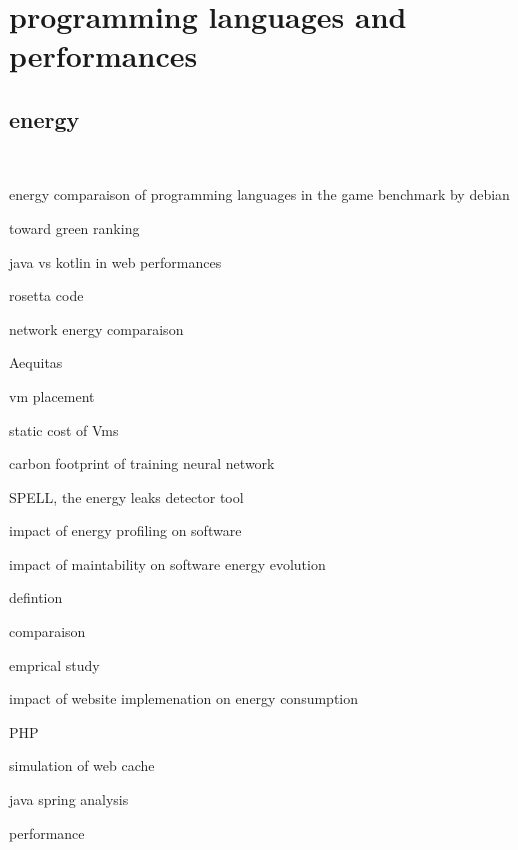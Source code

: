 \cite{marathe2017empirical}



\section{programming languages and performances}\label{section:soa_optimization}
\subsection{energy}\


energy comparaison of programming languages in the game benchmark by debian \cite{pereira2017energy}

toward green ranking \cite{couto2017towards}

java vs kotlin in web performances \cite{bujnowski2020java}

rosetta code \cite{nanz2015comparative} \cite{mirowski2020rosetta}

network energy comparaison \cite{balasubramanian2009energy}

Aequitas \cite{ribic2016aequitas}

vm placement \cite{mishra2018energy}

\citeauthor{mishra2018energy}

static cost of Vms \cite{kurpicz2016much}



carbon footprint of training neural network \cite{strubell2019energy}

SPELL, the energy leaks detector tool \cite{pereira2017helping}

impact of energy profiling on software \cite{jagroep2017energy}

impact of maintability on software energy evolution \cite{calero2021does}

defintion \cite{wang1993grpc}

comparaison \cite{chamas2017comparing}

emprical study \cite{de2021empirical}

impact of website implemenation on energy consumption \cite{philippot_characterization_2014} \cite{manotas2013investigating}

PHP \cite{benmoussa_new_2019} \cite{das_comparison_2016}

simulation of web cache \cite{cardenas_performance_2005}

java spring analysis \cite{gajewski_analysis_2019}

performance \cite{mishra2021web}


